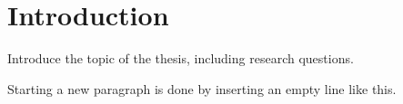 \chapter{Introduction}\label{ch:intro}

Introduce the topic of the thesis, including research questions.

Starting a new paragraph is done by inserting an empty line like this.
